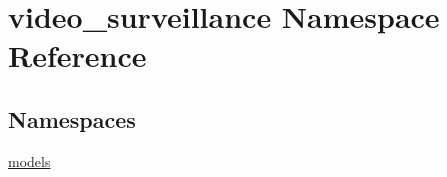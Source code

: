 \hypertarget{namespacevideo__surveillance}{}\section{video\+\_\+surveillance Namespace Reference}
\label{namespacevideo__surveillance}
\subsection*{Namespaces}
\begin{DoxyCompactItemize}
\item 
 \hyperlink{namespacevideo__surveillance_1_1models}{models}
\end{DoxyCompactItemize}
